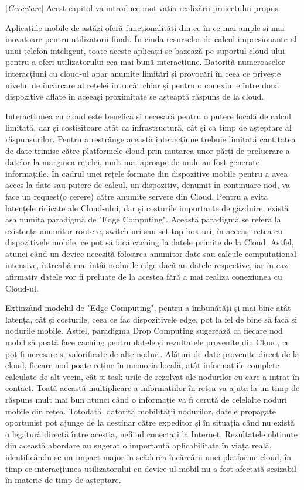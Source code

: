 \documentclass[12pt,a4paper]{report}
\newcommand{\worktype}[1]{[\textit{#1}] }
\newcommand{\cercetare}{\worktype{Cercetare}}
\begin{document}
\cercetare Acest capitol va introduce motivația realizării proiectului propus.

Aplicațiile mobile de astăzi oferă funcționalități din ce în ce mai ample și mai inovatoare pentru utilizatorii finali. În ciuda resurselor de calcul impresionante al unui telefon inteligent, toate aceste aplicații se bazează pe suportul cloud-ului pentru a oferi utilizatorului cea mai bună interacțiune. Datorită numeroaselor interacțiuni cu cloud-ul apar anumite limitări și provocări în ceea ce privește nivelul de încărcare al rețelei întrucât chiar și pentru o conexiune între două dispozitive aflate în aceeași proximitate se așteaptă răspuns de la cloud.

Interacțiunea cu cloud este benefică și necesară pentru o putere locală de calcul limitată, dar și costisitoare atât ca infrastructură, cât și ca timp de așteptare al răspunsurilor. Pentru a restrânge această interacțiune trebuie limitată cantitatea de date trimise către platformele cloud prin mutarea unor părți de prelucrare a datelor la marginea rețelei, mult mai aproape de unde au fost generate informațiile. În cadrul unei rețele formate din dispozitive mobile pentru a avea acces la date sau putere de calcul, un dispozitiv, denumit în continuare nod, va face un request(o cerere) către anumite servere din Cloud. Pentru a evita latențele ridicate ale Cloud-ului, dar și costurile importante de găzduire, există așa numita paradigmă de "Edge Computing". Această paradigmă se referă la existența anumitor routere, switch-uri sau set-top-box-uri, în aceeași rețea cu dispozitivele mobile, ce pot să facă caching la datele primite de la Cloud. Astfel, atunci când un device necesită folosirea anumitor date sau calcule computațional intensive, întreabă mai întâi nodurile edge dacă au datele respective, iar în caz afirmativ datele vor fi preluate de la acestea fără a mai realiza conexiunea cu Cloud-ul.

Extinzând modelul de "Edge Computing", pentru a îmbunătăți și mai bine atât latența, cât și costurile, ceea ce fac dispozitivele edge, pot la fel de bine să facă și nodurile mobile. Astfel, paradigma Drop Computing sugerează ca fiecare nod mobil să poată face caching pentru datele și rezultatele provenite din Cloud, ce pot fi necesare și valorificate de alte noduri. Alături de date provenite direct de la cloud, fiecare nod poate reține în memoria locală, atât informațiile complete calculate de alt vecin, cât și task-urile de rezolvat ale nodurilor cu care a intrat în contact. Toată această multiplicare a informațiilor în rețea va ajuta la un timp de răspuns mult mai bun atunci când o informație va fi cerută de celelalte noduri mobile din rețea. Totodată, datorită mobilității nodurilor, datele propagate oportunist pot ajunge de la destinar către expeditor și în situația când nu există o legătură directă între aceștia, nefiind conectați la Internet. Rezultatele obținute din această abordare au sugerat o importantă aplicabilitate în viața reală, identificându-se un impact major în scăderea încărcării unei platforme cloud, în timp ce interacțiunea utilizatorului cu device-ul mobil nu a fost afectată sesizabil în materie de timp de așteptare.
\end{document}
